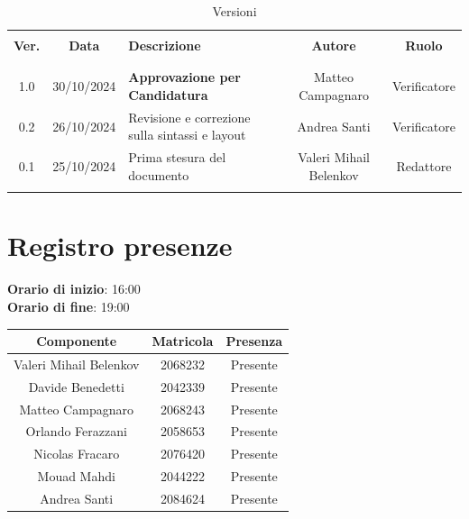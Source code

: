 \documentclass[italian, 12pt]{article}
\begin{document}
\pagestyle{mystyle}


\begin{table}[!h]
	\caption{Versioni}
	\begin{center}
        \fontsize{11.9}{13}\selectfont
		\begin{tabular}{ c c m{6cm} c c}
			\hline \\[-2ex]
			\textbf{Ver.} & \textbf{Data} & \textbf{Descrizione} & \textbf{Autore} & \textbf{Ruolo}  \\
			\\[-2ex] \hline \\[-1.5ex]
            1.0 & 30/10/2024 & \textbf{Approvazione per Candidatura} & Matteo Campagnaro & Verificatore\\
            0.2 & 26/10/2024 & Revisione e correzione sulla sintassi e layout & Andrea Santi & Verificatore  \\
			0.1 & 25/10/2024 & Prima stesura del documento & Valeri Mihail Belenkov & Redattore\\
			\\[-1.5ex] \hline
		\end{tabular}
	\end{center}
\end{table}


\tableofcontents
\newpage


\section{Registro presenze}

\textbf{Orario di inizio}: 16:00\\
\textbf{Orario di fine}: 19:00\\


\begin{flushleft}
	\begin{table}[!h]
	\begin{tabular}{ |c|c|c| } 
		\hline
		\textbf{Componente} & \textbf{Matricola} & \textbf{Presenza} \\
  \hline 
		Valeri Mihail Belenkov & 2068232 & Presente \\
		Davide Benedetti 	& 2042339 & Presente \\
		Matteo Campagnaro	& 2068243 & Presente \\
		Orlando Ferazzani 	& 2058653 & Presente \\
		Nicolas Fracaro 	& 2076420 & Presente \\
		Mouad Mahdi		    & 2044222 & Presente \\ 
		Andrea Santi 	    & 2084624 & Presente \\
		\hline
	\end{tabular}
	\end{table}
	\end{flushleft}
\end{document}
